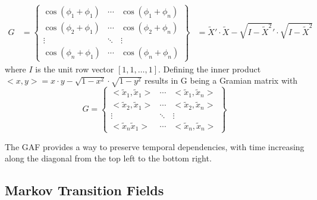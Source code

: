\begin{align}
	G &= \begin{Bmatrix}
		\cos(\phi_1 + \phi_1) & \cdots & \cos(\phi_1 + \phi_n) \\
		\cos(\phi_2 + \phi_1) & \cdots & \cos(\phi_2 + \phi_n) \\
		\vdots                & \ddots & \vdots \\
		\cos(\phi_n + \phi_1) & \cdots & \cos(\phi_n + \phi_n)
	\end{Bmatrix}
	&= \tilde{X}' \cdot \tilde{X} - \sqrt{I - \tilde{X}^2}' \cdot \sqrt{I - \tilde{X}^2}
\end{align}
where $I$ is the unit row vector $[1, 1, \ldots, 1]$.
Defining the inner product $< x,y> = x \cdot y - \sqrt{1 - x^2} \cdot \sqrt{1-y^2}$ results in G being a Gramian matrix with
\begin{equation}
	G = \begin{Bmatrix}
		< \tilde{x}_1, \tilde{x}_1 > & \cdots & < \tilde{x}_1, \tilde{x}_n >\\
		< \tilde{x}_2, \tilde{x}_1 > & \cdots & < \tilde{x}_2, \tilde{x}_n > \\
		\vdots                       & \ddots & \vdots \\
		< \tilde{x}_n \tilde{x}_1 > & \cdots & < \tilde{x}_n, \tilde{x}_n >
	\end{Bmatrix}
\end{equation}

The GAF provides a way to preserve temporal dependencies, with time increasing along the diagonal from the top left to the bottom right.

\subsection{Markov Transition Fields}

